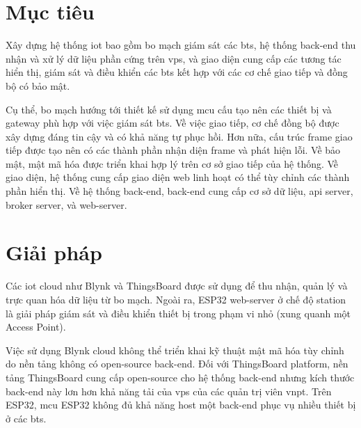 \section{Mục tiêu}

Xây dựng hệ thống \acrshort{iot} bao gồm bo mạch giám sát các \acrshort{bts}, hệ thống back-end thu nhận và xử lý dữ liệu phần cứng trên \acrshort{vps}, và giao diện cung cấp các tương tác hiển thị, giám sát và điều khiển các \acrshort{bts} kết hợp với các cơ chế giao tiếp và đồng bộ có bảo mật.

Cụ thể, bo mạch hướng tới thiết kế sử dụng \acrfull{mcu} cấu tạo nên các thiết bị và gateway phù hợp với việc giám sát \acrshort{bts}. Về việc giao tiếp, cơ chế đồng bộ được xây dựng đáng tin cậy và có khả năng tự phục hồi. Hơn nữa, cấu trúc frame giao tiếp được tạo nên có các thành phần nhận diện frame và phát hiện lỗi. Về bảo mật, mật mã hóa được triển khai hợp lý trên cơ sở giao tiếp của hệ thống. Về giao diện, hệ thống cung cấp giao diện web linh hoạt có thể tùy chỉnh các thành phần hiển thị. Về hệ thống back-end, back-end cung cấp cơ sở dữ liệu, \acrshort{api} server, broker server, và web-server.

\section{Giải pháp}

Các \acrshort{iot} cloud như Blynk và ThingsBoard được sử dụng để thu nhận, quản lý và trực quan hóa dữ liệu từ bo mạch. Ngoài ra, ESP32 web-server ở chế độ station là giải pháp giám sát và điều khiển thiết bị trong phạm vi nhỏ (xung quanh một Access Point).

Việc sử dụng Blynk cloud không thể triển khai kỹ thuật mật mã hóa tùy chỉnh do nền tảng không có open-source back-end. Đối với ThingsBoard platform, nền tảng ThingsBoard cung cấp open-source cho hệ thống back-end nhưng kích thước back-end này lơn hơn khả năng tải của \acrshort{vps} của các quản trị viên \acrshort{vnpt}. Trên ESP32, \acrshort{mcu} ESP32 không đủ khả năng host một back-end phục vụ nhiều thiết bị ở các \acrshort{bts}.

